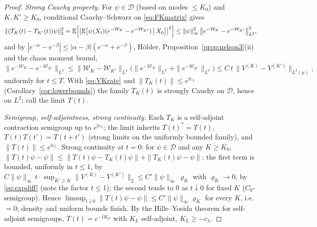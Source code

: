 \documentclass[11pt,a4paper]{article}
\theoremstyle{plain}
\theoremstyle{definition}
\newcommand{\E}{\mathbb{E}}
\newcommand{\D}{\mathcal D}
\newcommand{\muv}{\mu}
\begin{document}
\begin{proof}
\emph{Strong Cauchy property.} For $\psi\in\D$ (based on modes $\le K_0$)
and $K,K'\ge K_0$, conditional Cauchy--Schwarz on \eqref{eq:FKmatrix}
gives
\[
 \|(T_K(t)-T_{K'}(t))\psi\|_2^2
 =\E\Bigl[\bigl|\E\bigl[\psi(X_t)(e^{-\mathcal W_K}-e^{-\mathcal
 W_{K'}})\,\big|\,X_0\bigr]\bigr|^2\Bigr]
 \le\|\psi\|_\infty^2\,
 \bigl\|e^{-\mathcal W_K}-e^{-\mathcal W_{K'}}\bigr\|_{L^2}^2 ,
\]
and by $|e^{-\alpha}-e^{-\beta}|\le|\alpha-\beta|(e^{-\alpha}+e^{-\beta})$,
H\"older, Proposition~\ref{prop:nelson3}(ii) and the chaos moment bound,
\begin{equation}
 \bigl\|e^{-\mathcal W_K}-e^{-\mathcal W_{K'}}\bigr\|_{L^2}
 \le\|\mathcal W_K-\mathcal W_{K'}\|_{L^4}
 \bigl(\|e^{-\mathcal W_K}\|_{L^8}+\|e^{-\mathcal W_{K'}}\|_{L^8}\bigr)
 \le C\,t\,\|V^{(K)}-V^{(K')}\|_{L^2(\muv)},
 \label{eq:expdiff}
\end{equation}
uniformly for $t\le T$. With \eqref{eq:VKrate} and
$\|T_K(t)\|\le e^{tc_\lambda}$ (Corollary~\ref{cor:lowerbounds}) the
family $T_K(t)$ is strongly Cauchy on $\D$, hence on $L^2$; call the
limit $T(t)$.

\emph{Semigroup, self-adjointness, strong continuity.} Each $T_K$ is a
self-adjoint contraction semigroup up to $e^{tc_\lambda}$; the limit
inherits $T(t)^*=T(t)$, $T(t)T(t')=T(t+t')$ (strong limits on the
uniformly bounded family), and $\|T(t)\|\le e^{tc_\lambda}$. Strong
continuity at $t=0$: for $\psi\in\D$ and any $K\ge K_0$,
$\|T(t)\psi-\psi\|\le\|T(t)\psi-T_K(t)\psi\|+\|T_K(t)\psi-\psi\|$; the
first term is bounded, uniformly in $t\le1$, by
$C\|\psi\|_\infty\,t\cdot\sup_{K'\ge K}\|V^{(K)}-V^{(K')}\|_2
\le C'\|\psi\|_\infty\,\varrho_K$ with $\varrho_K\to0$, by
\eqref{eq:expdiff} (note the factor $t\le1$); the second tends to $0$ as
$t\downarrow0$ for fixed $K$ ($C_0$-semigroup). Hence
$\limsup_{t\downarrow0}\|T(t)\psi-\psi\|\le C'\|\psi\|_\infty\varrho_K$
for every $K$, i.e.\ $=0$; density and uniform bounds finish. By the
Hille--Yosida theorem for self-adjoint semigroups, $T(t)=e^{-tK_L}$ with
$K_L$ self-adjoint, $K_L\ge-c_\lambda$.


\end{proof}
\end{document}
